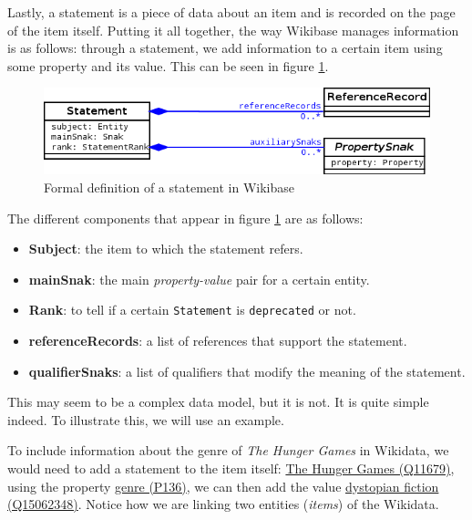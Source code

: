 Lastly, a statement is a piece of data about an item and is recorded on the page of the item itself. Putting it all together, the way Wikibase manages information is as follows: through a statement, we add information to a certain item using some property and its value. This can be seen in figure \ref{fig:wikibaseStatement}.

\begin{figure}[ht]
    \centering
    \includegraphics[width=.8\linewidth]{figures/diagrams/6-11_statement.png}
    \caption[Formal definition of a statement in Wikibase]{Formal definition of a statement in Wikibase\footnotemark}
    \label{fig:wikibaseStatement}
\end{figure}

The different components that appear in figure \ref{fig:wikibaseStatement} are as follows:

\begin{itemize}
    \itemsep0.25em
    \item \textbf{Subject}: the item to which the statement refers.
    \item \textbf{mainSnak}: the main \textit{property-value} pair for a certain entity.
    \item \textbf{Rank}: to tell if a certain \texttt{Statement} is \texttt{deprecated} or not.
    \item \textbf{referenceRecords}: a list of references that support the statement.
    \item \textbf{qualifierSnaks}: a list of qualifiers that modify the meaning of the statement.
\end{itemize}

This may seem to be a complex data model, but it is not. It is quite simple indeed. To illustrate this, we will use an example.

\begin{example}
    \label{example:wikibaseGraph}
    To include information about the genre of \textit{The Hunger Games} in Wikidata, we would need to add a statement to the item itself: \href{https://www.wikidata.org/wiki/Q11679}{The Hunger Games (Q11679)}, using the property \href{https://www.wikidata.org/wiki/Property:P136}{genre (P136)}, we can then add the value \href{https://www.wikidata.org/wiki/Q15062348}{dystopian fiction (Q15062348)}. Notice how we are linking two entities (\textit{items}) of the Wikidata.
\end{example}


